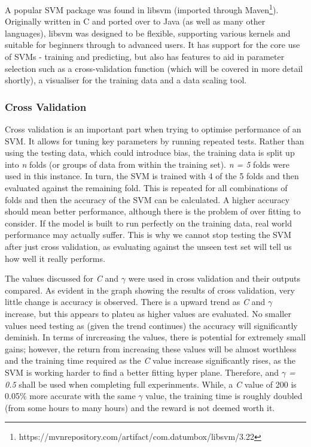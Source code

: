 A popular SVM package was found in libsvm (imported through Maven\footnote{https://mvnrepository.com/artifact/com.datumbox/libsvm/3.22}). Originally written in C and ported over to Java (as well as many other languages), libsvm was designed to be flexible, supporting various kernels and suitable for beginners through to advanced users. It has support for the core use of SVMs - training and predicting, but also has features to aid in parameter selection such as a cross-validation function (which will be covered in more detail shortly), a visualiser for the training data and a data scaling tool.


\subsubsection*{Cross Validation}
Cross validation is an important part when trying to optimise performance of an SVM. It allows for tuning key parameters by running repeated tests. Rather than using the testing data, which could introduce bias, the training data is split up into \textit{n} folds (or groups of data from within the training set). \textit{n = 5} folds were used in this instance. In turn, the SVM is trained with 4 of the 5 folds and then evaluated against the remaining fold. This is repeated for all combinations of folds and then the accuracy of the SVM can be calculated. A higher accuracy should mean better performance, although there is the problem of over fitting to consider. If the model is built to run perfectly on the training data, real world performance may actually suffer. This is why we cannot stop testing the SVM after just cross validation, as evaluating against the unseen test set will tell us how well it really performs. 

The values discussed for \textit{C} and $\gamma$ were used in cross validation and their outputs compared. 
As evident in the graph showing the results of cross validation, very little change is accuracy is observed. There is a upward trend as \textit{C} and $\gamma$ increase, but this appears to plateu as higher values are evaluated. No smaller values need testing as (given the trend continues) the accuracy will significantly deminish. In terms of inrcreasing the values, there is potential for extremely small gains; however, the return from increasing these values will be almost worthless and the training time required as the \textit{C} value increase significantly rises, as the SVM is working harder to find a better fitting hyper plane. Therefore,  and \textit{$\gamma$ = 0.5} shall be used when completing full experinments. While, a \textit{C} value of 200 is 0.05\% more accurate with the same $\gamma$ value, the training time is roughly doubled (from some hours to many hours) and the reward is not deemed worth it.

